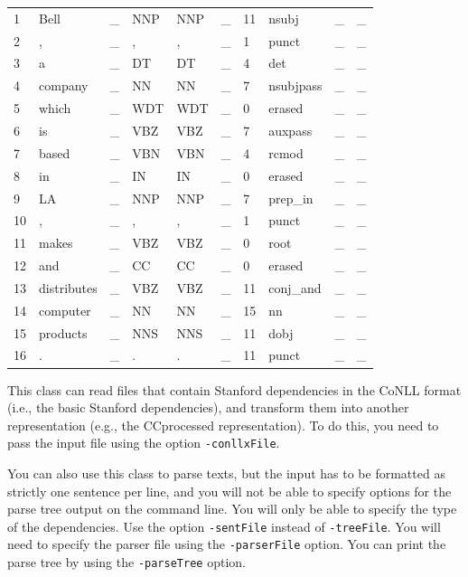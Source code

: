 \documentclass[11pt,letter]{article}
\begin{document}
\bigskip

\begin{tabular}{llllllllll}
1 &	Bell&	\_ &	NNP	&NNP&	\_&	11&	nsubj&	\_&	\_ \\
2 &	, &	\_ &	, &	, &	\_ &	1 &	punct &	\_ &	\_ \\
3 &	a &	\_ &	DT &	DT &	\_ &	4 &	det &	\_ &	\_ \\
4 &	company	 & \_ &	NN &	NN &	\_ &	7 &	nsubjpass &	\_ &	\_ \\
5 &	which &	\_ &	WDT &	WDT &	\_ &	0 &	erased &	\_ &	\_ \\
6 &	is &	\_ &	VBZ &	VBZ &	\_ &	7 &	auxpass &	\_ &\_ \\
7 &	based &	\_ &	VBN &	VBN &	\_ &	4 &	rcmod &	\_ &	\_ \\
8 &	in &	\_ &	IN	 & IN &	\_ &	0 &	erased &	\_ &	\_ \\
9 &	LA &	\_ &	NNP	 & NNP &	\_ &	7 &	prep\_in	 & \_ &	\_ \\
10 &	, &	\_ &	, &	, &	\_ &	1 &	punct &	\_ &	\_ \\
11 &	makes &	\_ &	VBZ &	VBZ &	\_ &	0 &	root &	\_ &	\_ \\
12 &	and &	\_ &	CC &	CC &	\_ &	0 &	erased &	\_ &	\_ \\
13 &	distributes &	\_ &	VBZ	 & VBZ &	\_ &	11 &	conj\_and &	\_ &	\_ \\
14 &	computer &	\_ &	NN &	NN &	\_ &	15 &	nn &	\_ &	\_ \\
15 &	products &	\_ &	NNS	 & NNS &	\_ &	11 &	dobj &	\_ &	\_ \\
16 &	. &	\_ &	. &	. &	\_ &	11 &	punct &	\_ &	\_
\end{tabular}

\vspace*{.4cm}
\noindent This class can read files that contain Stanford dependencies
in the CoNLL format (i.e., the basic Stanford dependencies), and
transform them into another representation (e.g., the CCprocessed
representation). To do this, you need to pass the input file using the
option \texttt{-conllxFile}.

\bigskip

\noindent You can also use this class to parse texts, but  the input has to be formatted as strictly one sentence per line, and you will not be able to specify options for the parse tree output on the command line. You will only be able to specify the type of the dependencies. Use the option \texttt{-sentFile} instead of \texttt{-treeFile}. You will need to specify the parser file using the \texttt{-parserFile} option. You can print the parse tree by using the \texttt{-parseTree} option.
\end{document}
